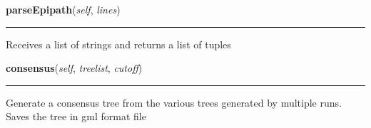     \vspace{0.5ex}

    \begin{boxedminipage}{\textwidth}

    \raggedright \textbf{parseEpipath}(\textit{self}, \textit{lines})

    \vspace{-1.5ex}

    \rule{\textwidth}{0.5\fboxrule}
    Receives a list of strings and returns a list of tuples

    \vspace{1ex}

    \end{boxedminipage}

    \label{Epigrass:spread:Consensus:consensus}

    \vspace{0.5ex}

    \begin{boxedminipage}{\textwidth}

    \raggedright \textbf{consensus}(\textit{self}, \textit{treelist}, \textit{cutoff})

    \vspace{-1.5ex}

    \rule{\textwidth}{0.5\fboxrule}
    Generate a consensus tree from the various trees generated by multiple 
    runs. Saves the tree in gml format file

    \vspace{1ex}

    \end{boxedminipage}

